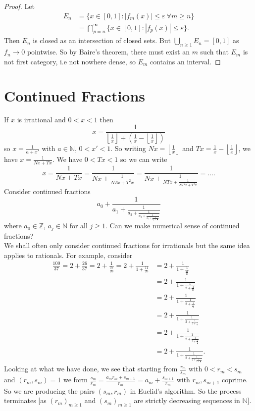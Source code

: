\documentclass[a4paper, 10pt, twocolumn]{amsart}
\theoremstyle{definition}
\newcommand{\bb}[1]{\mathbb{#1}}
\newcommand{\eps}[0]{\varepsilon}
\newcommand{\1}{\mathbbm{1}}
\newcommand{\floor}[1]{\left\lfloor #1 \right\rfloor}
\begin{document}
\begin{proof}
    Let \begin{align*}
        E_n &= \{x \in [0,1]: |f_m(x)|\le \eps \ \forall m\ge n\}\\
        &= \bigcap_{p=n}^\infty \{x \in [0,1]: |f_p(x)| \le \eps\}.
    \end{align*}
    Then $E_n$ is closed as an intersection of closed sets. But $\bigcup_{n\ge 1}E_n = [0,1]$ as $f_n \to 0$ pointwise. So by Baire's theorem, there must exist an $m$ such that $E_m$ is not first category, i.e not nowhere dense, so $E_m$ contains an interval. 
\end{proof}

\section{Continued Fractions}

If $x$ is irrational and $0<x<1$ then \[x= \frac{1}{\floor{\frac{1}{x}}+\left(\frac{1}{x}-\floor{\frac{1}{x}}\right)}\]
so $x =\frac{1}{a+x'}$ with $a \in \bb{N}$, $0<x'<1$. So writing $Nx = \floor{\frac{1}{x}}$ and $Tx =\frac{1}{x}-\floor{\frac{1}{x}}$, we have $x = \frac{1}{Nx+Tx}$. We have $0<Tx<1$ so we can write \[x= \frac{1}{Nx+Tx}= \frac{1}{Nx+\frac{1}{NTx+T^2x}} = \frac{1}{Nx+\frac{1}{NTx+\frac{1}{NT^2x+T^3x}}}=\ldots .\]
Consider continued fractions \[a_0+\frac{1}{a_1+\frac{1}{a_2+\frac{1}{a_3+\frac{1}{a_4+\frac{1}{a_5+\frac{1}{\ddots}}}}}}\]
where $a_0 \in \bb{Z}$, $a_j \in \bb{N}$ for all $j\ge 1$. Can we make numerical sense of continued fractions? \\

We shall often only consider continued fractions for irrationals but the same idea applies to rationals. For example, consider \begin{align*}
    \frac{100}{37} = 2+\frac{26}{37} = 2+\frac{1}{\frac{37}{26}} = 2+\frac{1}{1+\frac{11}{26}} &= 2+\frac{1}{1+\frac{1}{\frac{26}{11}}}\\
    &= 2+\frac{1}{1+\frac{1}{2+\frac{4}{11}}}\\
    &= 2+\frac{1}{1+\frac{1}{2+\frac{1}{\frac{11}{4}}}}\\
    &=2+\frac{1}{1+\frac{1}{2+\frac{1}{2+\frac{3}{4}}}}\\
    &= 2+\frac{1}{1+\frac{1}{2+\frac{1}{2+\frac{1}{\frac{4}{3}}}}}\\
    &= 2+\frac{1}{1+\frac{1}{2+\frac{1}{2+\frac{1}{1+\frac{1}{3}}}}}.
\end{align*}
Looking at what we have done, we see that starting from $\frac{r_m}{s_m}$ with $0<r_m<s_m$ and $(r_m,s_m) = 1$ we form $\frac{s_m}{r_m} = \frac{a_mr_m+s_{m+1}}{r_m} = a_m + \frac{s_{m+1}}{r_m}$ with $r_m,s_{m+1}$ coprime. So we are producing the pairs $(s_m,r_m)$ in Euclid's algorithm. So the process terminates [as $(r_m)_{m\ge 1}$ and $(s_m)_{m\ge 1}$ are strictly decreasing sequences in $\bb{N}$].\\
\end{document}
